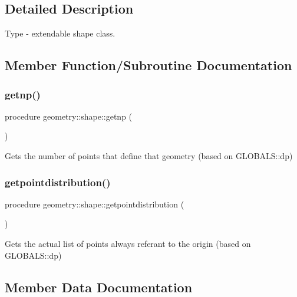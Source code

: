 \subsection{Detailed Description}
Type -\/ extendable shape class. 

\subsection{Member Function/\+Subroutine Documentation}
\mbox{\label{structgeometry_1_1shape_ad661871b6433bc48b165c400524dde90}} 
\subsubsection{\texorpdfstring{getnp()}{getnp()}}
{\footnotesize\ttfamily procedure geometry\+::shape\+::getnp (\begin{DoxyParamCaption}{ }\end{DoxyParamCaption})\hspace{0.3cm}{\ttfamily [private]}}



Gets the number of points that define that geometry (based on G\+L\+O\+B\+A\+L\+S\+::dp) 

\mbox{\label{structgeometry_1_1shape_a9df712486b716b472955c14057eab7ff}} 
\subsubsection{\texorpdfstring{getpointdistribution()}{getpointdistribution()}}
{\footnotesize\ttfamily procedure geometry\+::shape\+::getpointdistribution (\begin{DoxyParamCaption}{ }\end{DoxyParamCaption})\hspace{0.3cm}{\ttfamily [private]}}



Gets the actual list of points always referant to the origin (based on G\+L\+O\+B\+A\+L\+S\+::dp) 



\subsection{Member Data Documentation}
\mbox{\label{structgeometry_1_1shape_aada595aa3503cf22350737caf2931e6a}} 
